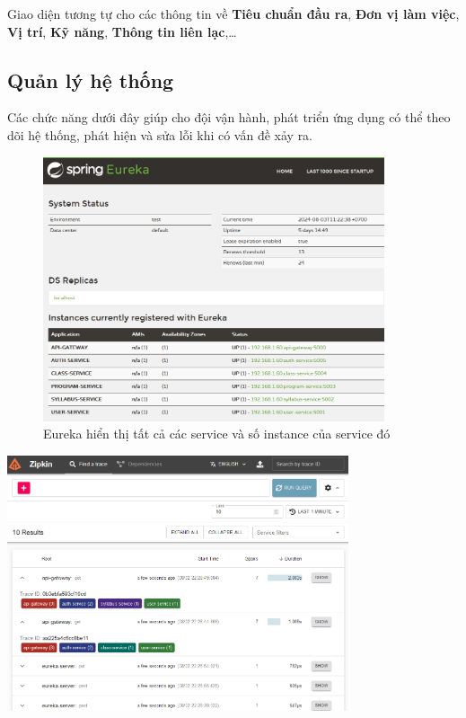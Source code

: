\documentclass[report.tex]{subfiles}
\begin{document}
Giao diện tương tự cho các thông tin về
\textbf{Tiêu chuẩn đầu ra},
\textbf{Đơn vị làm việc},
\textbf{Vị trí},
\textbf{Kỹ năng},
\textbf{Thông tin liên lạc},\dots

\subsection{Quản lý hệ thống}

Các chức năng dưới đây giúp cho đội vận hành, phát triển ứng dụng có thể theo dõi hệ thống, phát hiện và sửa lỗi khi có vấn đề xảy ra.

\begin{figure}[!htb]
{\centering
\includegraphics[width=380px]{../meta/ui.eureka.png}
\caption[Màn hình Eureka]{Eureka hiển thị tất cả các service và số instance của service đó}
\par
}
\end{figure}
\FloatBarrier

{\centering
\includegraphics[width=380px]{../meta/ui.zipkin-1.png}
\par
}
\end{document}
